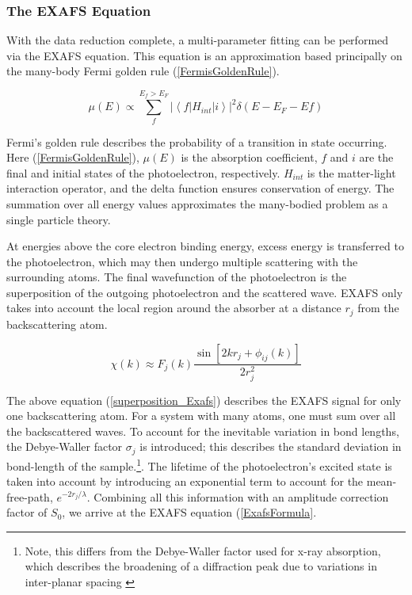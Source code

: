 \subsubsection{The EXAFS Equation}
With the data reduction complete, a multi-parameter fitting can be performed via the EXAFS equation. This equation is an approximation based principally on the many-body Fermi golden rule (\ref{FermisGoldenRule}).

\begin{equation}
    \label{FermisGoldenRule}
    \mu(E) \varpropto \sum_{f}^{E_f > E_F} \left\lvert \left\langle f \lvert H_{int} \rvert i \right\rangle \right\rvert ^2 \delta (E - E_F - Ef)  
\end{equation}

\noindent Fermi's golden rule describes the probability of a transition in state occurring. Here (\ref{FermisGoldenRule}), $ \mu(E) $ is the absorption coefficient, $ f $ and $ i $ are the final and initial states of the photoelectron, respectively. $ H_{int} $ is the matter-light interaction operator, and the delta function ensures conservation of energy. The summation over all energy values approximates the many-bodied problem as a single particle theory. 

At energies above the core electron binding energy, excess energy is transferred to the photoelectron, which may then undergo multiple scattering with the surrounding atoms. The final wavefunction of the photoelectron is the superposition of the outgoing photoelectron and the scattered wave. EXAFS only takes into account the local region around the absorber at a distance $ r_j $  from the backscattering atom.

\begin{equation}
    \label{superposition_Exafs}
    \chi(k) \approx F_j(k) \dfrac{\sin[2kr_j + \phi_{ij}(k)]}{2r_j^2}
\end{equation}

The above equation (\ref{superposition_Exafs}) describes the EXAFS signal for only one backscattering atom. For a system with many atoms, one must sum over all the backscattered waves. To account for the inevitable variation in bond lengths, the Debye-Waller factor $ \sigma_j $ is introduced; this describes the standard deviation in bond-length of the sample.\footnote{Note, this differs from the Debye-Waller factor used for x-ray absorption, which describes the broadening of a diffraction peak due to variations in inter-planar spacing \cite{DW-diffraction}}. The lifetime of the photoelectron's excited state is taken into account by introducing an exponential term to account for the mean-free-path, $ e^{-2r_j/\lambda} $. Combining all this information with an amplitude correction factor of $ S_0 $, we arrive at the EXAFS equation (\ref{ExafsFormula}. 

